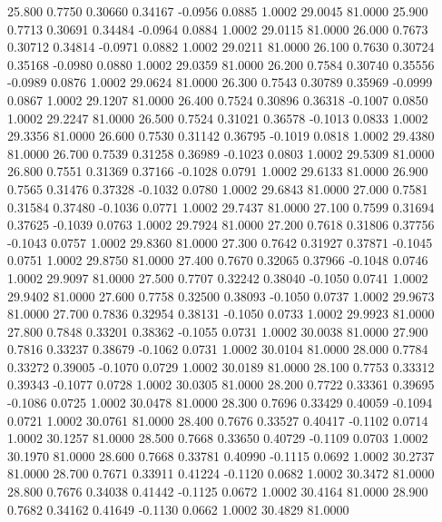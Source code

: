   25.800   0.7750   0.30660   0.34167  -0.0956   0.0885   1.0002  29.0045  81.0000
  25.900   0.7713   0.30691   0.34484  -0.0964   0.0884   1.0002  29.0115  81.0000
  26.000   0.7673   0.30712   0.34814  -0.0971   0.0882   1.0002  29.0211  81.0000
  26.100   0.7630   0.30724   0.35168  -0.0980   0.0880   1.0002  29.0359  81.0000
  26.200   0.7584   0.30740   0.35556  -0.0989   0.0876   1.0002  29.0624  81.0000
  26.300   0.7543   0.30789   0.35969  -0.0999   0.0867   1.0002  29.1207  81.0000
  26.400   0.7524   0.30896   0.36318  -0.1007   0.0850   1.0002  29.2247  81.0000
  26.500   0.7524   0.31021   0.36578  -0.1013   0.0833   1.0002  29.3356  81.0000
  26.600   0.7530   0.31142   0.36795  -0.1019   0.0818   1.0002  29.4380  81.0000
  26.700   0.7539   0.31258   0.36989  -0.1023   0.0803   1.0002  29.5309  81.0000
  26.800   0.7551   0.31369   0.37166  -0.1028   0.0791   1.0002  29.6133  81.0000
  26.900   0.7565   0.31476   0.37328  -0.1032   0.0780   1.0002  29.6843  81.0000
  27.000   0.7581   0.31584   0.37480  -0.1036   0.0771   1.0002  29.7437  81.0000
  27.100   0.7599   0.31694   0.37625  -0.1039   0.0763   1.0002  29.7924  81.0000
  27.200   0.7618   0.31806   0.37756  -0.1043   0.0757   1.0002  29.8360  81.0000
  27.300   0.7642   0.31927   0.37871  -0.1045   0.0751   1.0002  29.8750  81.0000
  27.400   0.7670   0.32065   0.37966  -0.1048   0.0746   1.0002  29.9097  81.0000
  27.500   0.7707   0.32242   0.38040  -0.1050   0.0741   1.0002  29.9402  81.0000
  27.600   0.7758   0.32500   0.38093  -0.1050   0.0737   1.0002  29.9673  81.0000
  27.700   0.7836   0.32954   0.38131  -0.1050   0.0733   1.0002  29.9923  81.0000
  27.800   0.7848   0.33201   0.38362  -0.1055   0.0731   1.0002  30.0038  81.0000
  27.900   0.7816   0.33237   0.38679  -0.1062   0.0731   1.0002  30.0104  81.0000
  28.000   0.7784   0.33272   0.39005  -0.1070   0.0729   1.0002  30.0189  81.0000
  28.100   0.7753   0.33312   0.39343  -0.1077   0.0728   1.0002  30.0305  81.0000
  28.200   0.7722   0.33361   0.39695  -0.1086   0.0725   1.0002  30.0478  81.0000
  28.300   0.7696   0.33429   0.40059  -0.1094   0.0721   1.0002  30.0761  81.0000
  28.400   0.7676   0.33527   0.40417  -0.1102   0.0714   1.0002  30.1257  81.0000
  28.500   0.7668   0.33650   0.40729  -0.1109   0.0703   1.0002  30.1970  81.0000
  28.600   0.7668   0.33781   0.40990  -0.1115   0.0692   1.0002  30.2737  81.0000
  28.700   0.7671   0.33911   0.41224  -0.1120   0.0682   1.0002  30.3472  81.0000
  28.800   0.7676   0.34038   0.41442  -0.1125   0.0672   1.0002  30.4164  81.0000
  28.900   0.7682   0.34162   0.41649  -0.1130   0.0662   1.0002  30.4829  81.0000
